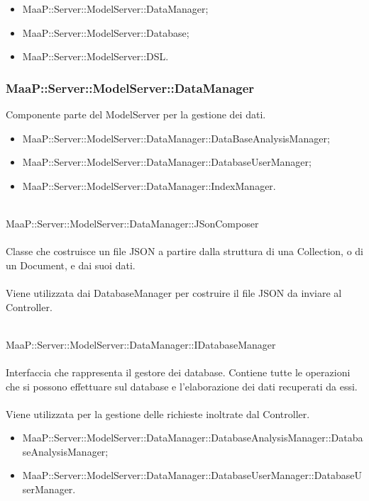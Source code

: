 \begin{itemize}
\item MaaP::Server::ModelServer::DataManager;
\item MaaP::Server::ModelServer::Database;
\item MaaP::Server::ModelServer::DSL.
\end{itemize}

\subsubsection{MaaP::Server::ModelServer::DataManager}
Componente parte del ModelServer per la gestione dei dati.
\begin{itemize}
\item MaaP::Server::ModelServer::DataManager::DataBaseAnalysisManager;
\item MaaP::Server::ModelServer::DataManager::DatabaseUserManager;
\item MaaP::Server::ModelServer::DataManager::IndexManager.
\end{itemize}

	\\
	MaaP::Server::ModelServer::DataManager::JSonComposer\\
	\\
	Classe che costruisce un file JSON a partire dalla struttura di una Collection, o di un Document, e dai suoi dati.\\
	\\
	Viene utilizzata dai DatabaseManager per costruire il file JSON da inviare al Controller.

	\\
	MaaP::Server::ModelServer::DataManager::IDatabaseManager\\
	\\
	Interfaccia che rappresenta il gestore dei database. Contiene tutte le operazioni che si possono effettuare sul database e l'elaborazione dei dati recuperati da essi.\\
	\\
	Viene utilizzata per la gestione delle richieste inoltrate dal Controller.\\
	\begin{itemize}
	\item MaaP::Server::ModelServer::DataManager::DatabaseAnalysisManager::DatabaseAnalysisManager;
	\item MaaP::Server::ModelServer::DataManager::DatabaseUserManager::DatabaseUserManager.	
	\end{itemize}

